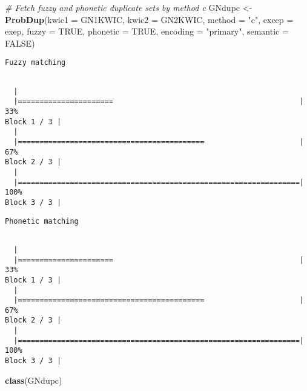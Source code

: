\documentclass[]{article}
\newenvironment{Shaded}{\begin{snugshade}}{\end{snugshade}}
\newcommand{\CommentTok}[1]{\textcolor[rgb]{0.56,0.35,0.01}{\textit{#1}}}
\newcommand{\DataTypeTok}[1]{\textcolor[rgb]{0.13,0.29,0.53}{#1}}
\newcommand{\KeywordTok}[1]{\textcolor[rgb]{0.13,0.29,0.53}{\textbf{#1}}}
\newcommand{\NormalTok}[1]{#1}
\newcommand{\OtherTok}[1]{\textcolor[rgb]{0.56,0.35,0.01}{#1}}
\newcommand{\StringTok}[1]{\textcolor[rgb]{0.31,0.60,0.02}{#1}}
\begin{document}
\begin{Shaded}
\begin{Highlighting}[]
\CommentTok{# Fetch fuzzy and phonetic duplicate sets by method c}
\NormalTok{GNdupc <-}\StringTok{ }\KeywordTok{ProbDup}\NormalTok{(}\DataTypeTok{kwic1 =}\NormalTok{ GN1KWIC, }\DataTypeTok{kwic2 =}\NormalTok{ GN2KWIC, }\DataTypeTok{method =} \StringTok{"c"}\NormalTok{,}
                  \DataTypeTok{excep =}\NormalTok{ exep, }\DataTypeTok{fuzzy =} \OtherTok{TRUE}\NormalTok{, }\DataTypeTok{phonetic =} \OtherTok{TRUE}\NormalTok{,}
                  \DataTypeTok{encoding =} \StringTok{"primary"}\NormalTok{, }\DataTypeTok{semantic =} \OtherTok{FALSE}\NormalTok{)}
\end{Highlighting}
\end{Shaded}

\begin{verbatim}
Fuzzy matching
\end{verbatim}

\begin{verbatim}

  |                                                                       
  |======================                                           |  33%
Block 1 / 3 |
  |                                                                       
  |===========================================                      |  67%
Block 2 / 3 |
  |                                                                       
  |=================================================================| 100%
Block 3 / 3 |
\end{verbatim}

\begin{verbatim}
Phonetic matching
\end{verbatim}

\begin{verbatim}

  |                                                                       
  |======================                                           |  33%
Block 1 / 3 |
  |                                                                       
  |===========================================                      |  67%
Block 2 / 3 |
  |                                                                       
  |=================================================================| 100%
Block 3 / 3 |
\end{verbatim}

\begin{Shaded}
\begin{Highlighting}[]
\KeywordTok{class}\NormalTok{(GNdupc)}
\end{Highlighting}
\end{Shaded}
\end{document}
